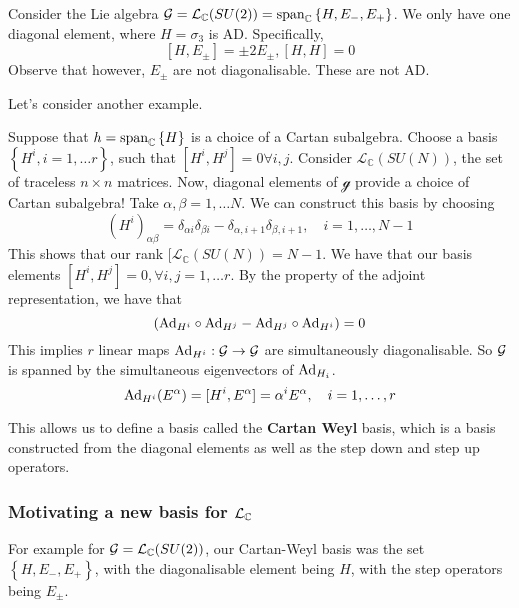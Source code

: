 \begin{example}
	Consider the Lie algebra $\mathcal{ G }  = \mathcal{ L }_{ \mathbb{ C} } ( SU ( 2) )  = 
	\text{span}_{ \mathbb{ C} } \left\{  H , E_ - , E _ +  \right\} $. 
	We only have one diagonal element, where $ H  = \sigma _ 3 $  is AD. 
	Specifically, \[
		[ H , E_{ \pm } ] = \pm 2 E_{\pm}, [ H , H ] = 0 
	\] Observe that however, $ E_{ \pm } $ are not diagonalisable. 
	These are not AD. 
\end{example}
Let's consider another example. 
\begin{example}
	Suppose that $h  = \text{span}_{ \mathbb{ C} } \left\{  H  \right\} $ 
	is a choice of a Cartan subalgebra. 
	Choose a basis $\left\{  H ^ i, i =  1, \dots r  \right\} $, 
	such that $ [ H ^ i , H ^ j ] = 0 \forall i , j $. 
	Consider  $ \mathcal{L}_{ \mathbb{ C} } ( SU ( N ) )$, the set 
	of traceless $ n \times n $ matrices. 
	Now, diagonal elements of $ \mathcal{ g } $ provide a choice 
	of Cartan subalgebra! Take $ \alpha, \beta  = 1 , \dots N$. 
	We can construct this basis by choosing 
	 \[
	 \left(  H ^ i  \right)_{ \alpha \beta }  = 
	 \delta _{ \alpha i } \delta _{ \beta i }  - \delta _{ \alpha , i + 1 } \delta _{ \beta , 
	 i + 1 }, \quad i  = 1 , \dots , N - 1
 \] This shows that our rank $[\mathcal{ L }_{ \mathbb{ C} } ( SU ( N ) )  = N -1$. 
 We have that our basis elements $ [ H ^ i , H ^ j ] = 0, \forall i , j  = 1 , \dots r $. 
 By the property of the adjoint representation, we have that 
 \[
  \left(  \text{Ad}_{H ^ i } \circ \text{Ad}_{ H ^ j }  - \text{Ad}_{ H ^ j } \circ \text{Ad}_{ H ^ i }  \right) = 0  
 \] This implies $ r $ linear maps $\text{Ad}_{ H ^ i } : \mathcal{ G } \to \mathcal{ G } $ are simultaneously 
 diagonalisable. So $ \mathcal{ G } $ is spanned by the simultaneous eigenvectors of $ \text{Ad}_{ H _ i }$.
 \[
	 \text{Ad}_{ H ^ i } ( E ^{ \alpha } ) = [ H ^ i , E ^ \alpha ] = \alpha ^ i E ^ \alpha , 
	 \quad i = 1 , \dots,  r 
 \] 
\end{example}

This allows us to define a basis 
called the \textbf{Cartan Weyl} basis, which 
is a basis constructed from the diagonal elements as 
well as the step down and step up operators. 

\subsubsection*{Motivating a new basis for $ \mathcal{ L }_{ \mathbb{C} } $} 
For example for $ \mathcal{ G }  = \mathcal{ L } _ \mathbb{ C}  ( SU ( 2) ) $, 
our Cartan-Weyl basis was the set $\left\{  H , E_ - , E _ +  \right\} $, 
with the diagonalisable element being $ H $, with the step operators 
being $ E _{ \pm } $. 

